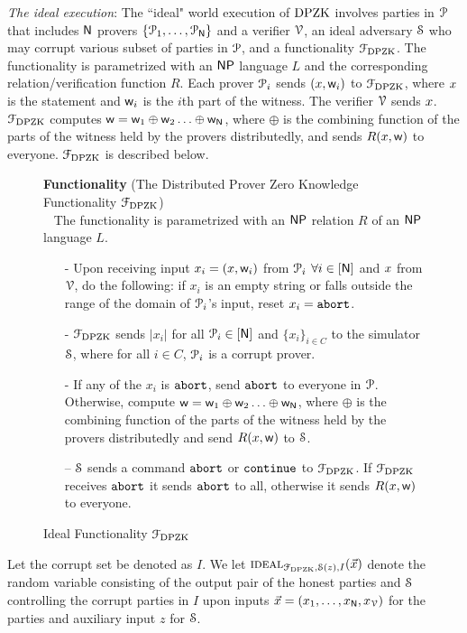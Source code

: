 \noindent\textit{The ideal execution}: The ``ideal" world execution of $\text{DPZK}$  involves parties in $\mathcal{P}$ that includes $\mathsf{N}$ provers $\{\mathcal{P}_1, \ldots, \mathcal{P}_{\mathsf{N}}\}$ and a verifier $\mathcal{V}$,  an ideal adversary $\mathcal{S}$ who may corrupt various subset of parties in $\mathcal{P}$, and a  functionality $\mathcal{F}_{\text{DPZK}}$.  The functionality is parametrized with an  $\mathsf{NP}$ language $L$ and  the corresponding relation/verification function $R$. Each prover $\mathcal{P}_i$ sends $({x},\mathsf{w}_i)$ to $\mathcal{F}_{\text{DPZK}}$, where ${x}$ is the statement and $\mathsf{w}_i$ is the $i$th part of the witness. The verifier $\mathcal{V}$ sends ${x}$.  $\mathcal{F}_{\text{DPZK}}$ computes $\mathsf{w} = \mathsf{w}_1 \oplus \mathsf{w}_2 \ldots \oplus \mathsf{w}_{\mathsf{N}}$, where $\oplus$ is the combining function of the parts of the witness held by the provers distributedly, and sends $R({x},\mathsf{w})$ to everyone. $\mathcal{F}_{\text{DPZK}}$  is described below. 
\begin{figure}[h!]
	\centering
	\begin{framed}
		\textbf{Functionality} (The Distributed Prover Zero Knowledge Functionality $\mathcal{F}_{\text{DPZK}}$)\\~
		The functionality is parametrized with an $\mathsf{NP}$ relation $R$ of an $\mathsf{NP}$ language $L$.
		\begin{itemize}
			\item[-] Upon receiving input $x_i = ({x}, \mathsf{w}_i)$ from $\mathcal{P}_i$ $\forall i\in[\mathsf{N}]$ and ${x}$ from $\mathcal{V}$, do the following: if $x_i$ is an empty string or falls outside the range of the domain of $\mathcal{P}_i$'s input,  reset $x_i = \texttt{abort}$. 
			\item[-] $\mathcal{F}_{\text{DPZK}}$ sends $|x_i|$ for all $\mathcal{P}_i \in [\mathsf{N}]$ and $\{x_i\}_{i\in C}$ to the simulator $\mathcal{S}$, where for all $i\in C$, $\mathcal{P}_i$ is a corrupt prover.
			\item[-] If any of the $x_i$ is $\texttt{abort}$, send $\texttt{abort}$ to everyone in $\mathcal{P}$. Otherwise,   compute $\mathsf{w} = \mathsf{w}_1 \oplus \mathsf{w}_2 \ldots \oplus \mathsf{w}_{\mathsf{N}}$, where $\oplus$ is the combining function of the parts of the witness held by the provers distributedly and send $R({x}, \mathsf{w})$ to $\mathcal{S}$. 
			\item[--] $\mathcal{S}$ sends a command $\texttt{abort}$ or $\texttt{continue}$ to $\mathcal{F}_{\text{DPZK}}$. If $\mathcal{F}_{\text{DPZK}}$ receives $\texttt{abort}$ it sends $\texttt{abort}$ to all, otherwise it sends $R({x}, \mathsf{w})$ to everyone. 
		\end{itemize}
	\end{framed}
	\caption{Ideal Functionality $\mathcal{F}_{\text{DPZK}}$}
\end{figure} \label{func:DPZK}
Let the corrupt set be denoted as $I$. We let $\textsc{ideal}_{\mathcal{F}_{\text{DPZK}}, \mathcal{S}(z),I}(\vec{x})$ denote the random variable consisting of the output pair of the honest parties and  $\mathcal{S}$ controlling the corrupt parties in $I$ upon inputs $\vec{x} = (x_1  ,\ldots,x_{\mathsf{N}},x_{\mathcal{V}})$ for the parties and auxiliary input $z$ for $\mathcal{S}$.  

